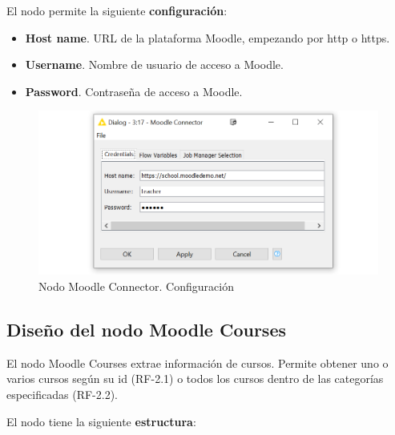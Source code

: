 El nodo permite la siguiente \textbf{configuración}: 

\begin{itemize}
   \item \textbf{Host name}. URL de la plataforma Moodle, empezando por http o https. 
   \item \textbf{Username}. Nombre de usuario de acceso a Moodle.
   \item \textbf{Password}. Contraseña de acceso a Moodle.
\end{itemize}

\begin{figure}[!h]
	\centering
	\includegraphics[width=1\textwidth]{img/nodes_moodle_connector_settings.png}
	\caption{Nodo Moodle Connector. Configuración}
	\label{fig:moodleconnector_settings}
\end{figure}
\FloatBarrier

\hphantom{ }

\newpage    
\subsection{Diseño del nodo Moodle Courses}

El nodo Moodle Courses extrae información de cursos. Permite obtener uno o varios cursos según su id (RF-2.1) o todos 
los cursos dentro de las categorías especificadas (RF-2.2). 
\

El nodo tiene la siguiente \textbf{estructura}:

